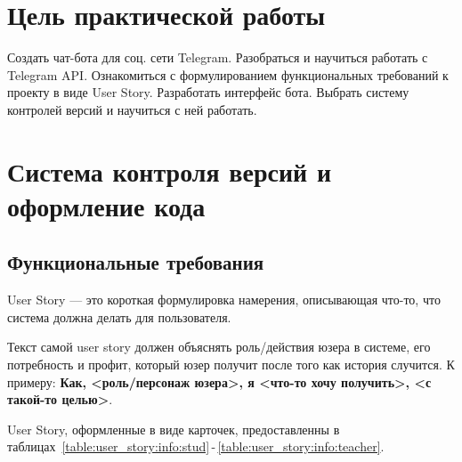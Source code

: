 \graphicspath{{./img/}} %

\chapter*{Цель практической работы}
Создать чат-бота для соц. сети Telegram. Разобраться и научиться работать
с Telegram API. Ознакомиться с формулированием функциональных
требований к проекту в виде User Story. Разработать интерфейс бота.
Выбрать систему контролей версий и научиться с ней работать.

\chapter{Система контроля версий и оформление кода}
\section{Функциональные требования}
User Story --- это короткая формулировка намерения, описывающая что-то,
что система должна делать для пользователя.\par
Текст самой user story должен объяснять роль/действия юзера в системе,
его потребность и профит, который юзер получит после того как история
случится. К примеру: \textbf{Как, <роль/персонаж юзера>, я <что-то хочу
получить>, <с такой-то целью>}.

User Story, оформленные в виде карточек, предоставленны в
таблицах~\ref{table:user_story:info:stud}\,-\,\ref{table:user_story:info:teacher}.

